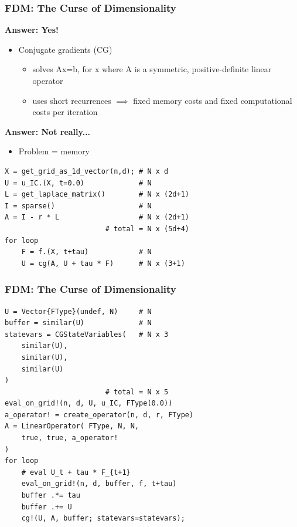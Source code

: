 \documentclass{beamer}
\begin{document}
\begin{frame}[fragile]
\frametitle{FDM: The Curse of Dimensionality}

\textbf{Answer: Yes!}
\pause
\begin{itemize}
    \item Conjugate gradients (CG)
    \begin{itemize}
        \item solves Ax=b, for x where A is a symmetric, positive-definite linear operator
        \item uses short recurrences $\implies$ fixed memory costs and fixed computational costs per iteration
    \end{itemize}
\end{itemize}

\pause
\textbf{Answer: Not really...}
\pause
\begin{itemize}
    \item Problem = memory
\end{itemize}

\pause
\begin{lstlisting}[breaklines=true,frame=single,basicstyle=\footnotesize\ttfamily]
X = get_grid_as_1d_vector(n,d); # N x d
U = u_IC.(X, t=0.0)             # N
L = get_laplace_matrix()        # N x (2d+1)
I = sparse()                    # N
A = I - r * L                   # N x (2d+1)
                        # total = N x (5d+4)
for loop
    F = f.(X, t+tau)            # N
    U = cg(A, U + tau * F)      # N x (3+1)
\end{lstlisting}

\end{frame}


\begin{frame}[fragile]
\frametitle{FDM: The Curse of Dimensionality}

\begin{lstlisting}[breaklines=true,frame=single,basicstyle=\footnotesize\ttfamily]
U = Vector{FType}(undef, N)     # N
buffer = similar(U)             # N
statevars = CGStateVariables(   # N x 3
    similar(U),
    similar(U),
    similar(U)
)
                        # total = N x 5
eval_on_grid!(n, d, U, u_IC, FType(0.0))
a_operator! = create_operator(n, d, r, FType)
A = LinearOperator( FType, N, N,
    true, true, a_operator!
)
for loop
    # eval U_t + tau * F_{t+1}
    eval_on_grid!(n, d, buffer, f, t+tau)
    buffer .*= tau
    buffer .+= U
    cg!(U, A, buffer; statevars=statevars);
\end{lstlisting}

\end{frame}
\end{document}
